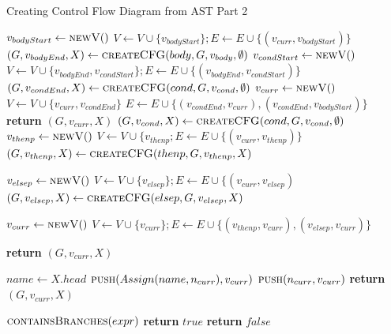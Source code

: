  \begin{algorithm}
 \addtocounter{algorithm}{-1}
 \caption{Creating Control Flow Diagram from AST Part 2}\label{CFG2}
 \begin{algorithmic}[1]
      	\State $v_{bodyStart} \gets \Call{newV}{ }$
      	\State $V \gets V \cup \{v_{bodyStart}\}; E \gets E \cup \{(v_{curr},v_{bodyStart})\}$
  	\State $(G,v_{bodyEnd},X)\gets \Call{createCFG}{body,G, v_{body},\emptyset} $
  	\State $v_{condStart} \gets \Call{newV}{ }$
      	\State $V \gets V \cup \{v_{bodyEnd}, v_{condStart}\}; E \gets E \cup \{(v_{bodyEnd},v_{condStart})\}$ 
      	\State $(G,v_{condEnd},X)\gets \Call{createCFG}{cond,G,v_{cond},\emptyset} $
      	\State $v_{curr} \gets \Call{newV}{ }$
      	\State $V \gets V \cup \{v_{curr},v_{condEnd}\}$
      	\State $E \gets E \cup \{(v_{condEnd},v_{curr}),(v_{condEnd},v_{bodyStart})\}$
      	\State \textbf{return} $(G,v_{curr},X)$
    \EndCase
  	\State $(G,v_{cond},X)\gets \Call{createCFG}{cond,G, v_{cond},\emptyset}$
  	\State $v_{thenp} \gets \Call{newV}{ }$
  	\State $V \gets V \cup \{ v_{thenp}; E \gets E \cup \{(v_{curr},v_{thenp})\}$
  	\State $(G,v_{thenp},X)\gets \Call{createCFG}{thenp,G, v_{thenp},X} $
  	
  	\State $v_{elsep} \gets \Call{newV}{ }$
  	\State $V \gets V \cup \{v_{elsep}\};E \gets E \cup \{(v_{curr},v_{elsep})$
  	\State $(G,v_{elsep},X)\gets \Call{createCFG}{elsep,G, v_{elsep},X} $
  	
  	\State $v_{curr} \gets \Call{newV}{ }$
  	\State $V \gets V \cup \{v_{curr}\};E \gets E \cup \{(v_{thenp},v_{curr}),(v_{elsep},v_{curr})\}$
 	  	
  	\State \textbf{return} $(G,v_{curr},X)$
    	
  \EndCase

  \Case { $\_$}
	\State $name \gets X.head$
  	\State $\Call{push}{Assign(name,n_{curr}),v_{curr}} $ 
  	\Else
  	\State $\Call{push}{n_{curr},v_{curr}} $ 
  	\EndIf 
  	\State \textbf{return} $(G,v_{curr},X)$
  	
  \EndCase
 
\EndSwitch
\EndProcedure
{}
  \State $\Call{containsBranches}{expr}$
  \EndCase
  	\State \textbf{return} $true$
  \EndCase
  \Case {$\_$}
    \State \textbf{return} $false$
    \EndCase
\EndSwitch
\EndProcedure
\end{algorithmic}
\end{algorithm}

